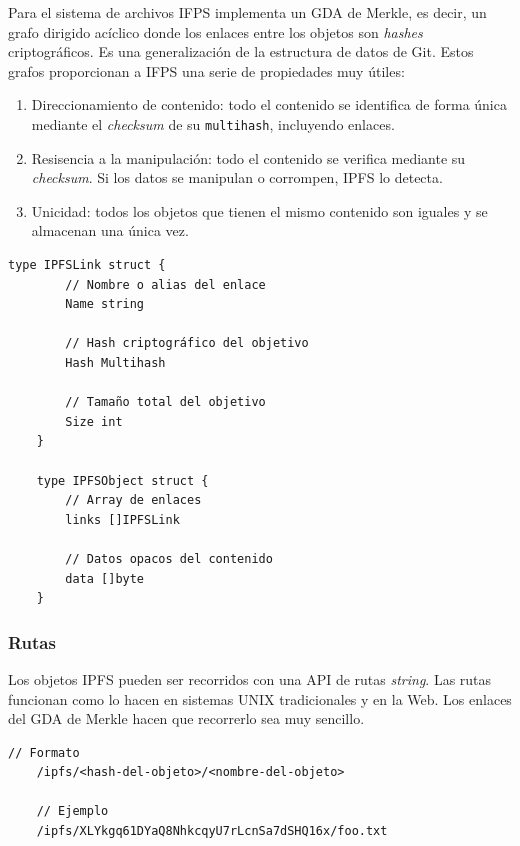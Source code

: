 \documentclass[12pt]{article} %
\begin{document}
Para el sistema de archivos IFPS implementa un GDA de Merkle, es decir, un grafo dirigido acíclico donde los enlaces entre los objetos son \textit{hashes} criptográficos. Es una generalización de la estructura de datos de Git. Estos grafos proporcionan a IFPS una serie de propiedades muy útiles:
\begin{enumerate}
	\item Direccionamiento de contenido: todo el contenido se identifica de forma única mediante el \textit{checksum} de su \texttt{multihash}, incluyendo enlaces.
	\item Resisencia a la manipulación: todo el contenido se verifica mediante su \textit{checksum}. Si los datos se manipulan o corrompen, IPFS lo detecta.
	\item Unicidad: todos los objetos que tienen el mismo contenido son iguales y se almacenan una única vez.
\end{enumerate}

\begin{lstlisting}[caption={Implementación de los objetos IPFS.}, language=Golang]
	type IPFSLink struct {
		// Nombre o alias del enlace
		Name string

		// Hash criptográfico del objetivo
		Hash Multihash

		// Tamaño total del objetivo
		Size int
	}

	type IPFSObject struct {
		// Array de enlaces
		links []IPFSLink

		// Datos opacos del contenido
		data []byte
	}
\end{lstlisting}

\subsubsection{Rutas} %
\label{ssub:rutas}

Los objetos IPFS pueden ser recorridos con una API de rutas \textit{string}. Las rutas funcionan como lo hacen en sistemas UNIX tradicionales y en la Web. Los enlaces del GDA de Merkle hacen que recorrerlo sea muy sencillo.

\begin{lstlisting}[caption={Rutas en IPFS.}]
	// Formato
	/ipfs/<hash-del-objeto>/<nombre-del-objeto>

	// Ejemplo
	/ipfs/XLYkgq61DYaQ8NhkcqyU7rLcnSa7dSHQ16x/foo.txt
\end{lstlisting}


\end{document}
